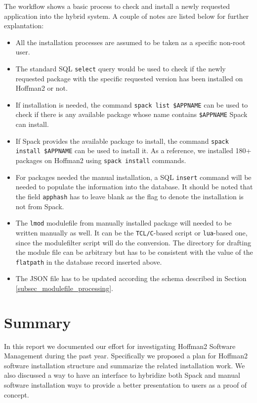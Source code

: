 \documentclass[conference]{IEEEtran}
\begin{document}
The workflow shows a basic process to check and install a newly requested application into the hybrid system. A couple of notes are listed below for further explantation:

\begin{itemize}
    \item All the installation processes are assumed to be taken as a specific non-root user.
    \item The standard SQL \verb|select| query would be used to check if the newly requested package with the specific requested version has been installed on Hoffman2 or not.
    \item If installation is needed, the command \verb|spack list $APPNAME|\cite{spack:20} can be used to check if there is any available package whose name contains \verb|$APPNAME| Spack can install. 
    \item If Spack provides the available package to install, the command \verb|spack install $APPNAME|\cite{spack:20} can be used to install it. As a reference, we installed 180+ packages on Hoffman2 using \verb|spack install| commands. 
    \item For packages needed the manual installation, a SQL \verb|insert| command will be needed to populate the information into the database. It should be noted that the field \verb|apphash| has to leave blank as the flag to denote the installation is not from Spack.
    \item The \verb|lmod| modulefile from manually installed package will needed to be written manually as well. It can be the \verb|TCL/C|-based script or \verb|lua|-based one, since the modulefilter script will do the conversion. The directory for drafting the module file can be arbitrary but has to be consistent with the value of the \verb|flatpath| in the database record inserted above.
    \item The JSON file has to be updated according the schema described in Section \ref{subsec_modulefile_processing}. 
\end{itemize}


\section{Summary} \label{sec_summary}

In this report we documented our effort for investigating Hoffman2 Software Management during the past year. Specifically we proposed a plan for Hoffman2 software installation structure and summarize the related installation work. We also discussed a way to have an interface to hybridize both Spack and manual software installation ways to provide a better presentation to users as a proof of concept.
\end{document}
